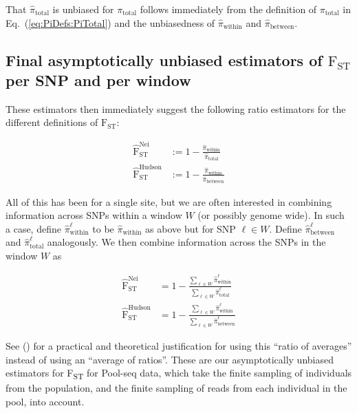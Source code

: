 \documentclass[a4paper,fontsize=9pt,DIV=14]{scrartcl}
\newcommand\eqnref[1]{Eq.~(\ref{#1})}
\newcommand{\fst}{F\textsubscript{ST}}
\newcommand\citeay[1]{\citeauthor{#1} (\citeyear{#1}) \cite{#1}}
\begin{document}
That $\widehat{\pi}_\text{total}$ is unbiased for $\pi_\text{total}$ follows immediately from the definition of $\pi_\text{total}$ in \eqnref{eq:PiDefs:PiTotal} and the unbiasedness of $\widehat{\pi}_\text{within}$ and $\widehat{\pi}_\text{between}$.


\subsection{Final asymptotically unbiased estimators of \texorpdfstring{$\text{F}_\text{ST}$}{FST} per SNP and per window}
\label{supp:sec:FST:sub:EstimatorFST}

These estimators then immediately suggest the following ratio estimators for the different definitions of $\text{F}_\text{ST}$:

\begin{align}
    \widehat{\text{F}}_\text{ST}^\text{Nei} &:= 1 - \frac{\widehat{\pi}_\text{within}}{\widehat{\pi}_\text{total}}\\
    \widehat{\text{F}}_\text{ST}^\text{Hudson} &:= 1 - \frac{\widehat{\pi}_\text{within}}{\widehat{\pi}_\text{between}}
\end{align}

All of this has been for a single site, but we are often interested in combining information across SNPs within a window $W$ (or possibly genome wide).
In such a case, define $\widehat{\pi}^\ell_\text{within}$ to be $\widehat{\pi}_\text{within}$ as above but for SNP $\ell \in W$.
Define $\widehat{\pi}^\ell_\text{between}$ and $\widehat{\pi}^\ell_\text{total}$ analogously.
We then combine information across the SNPs in the window $W$ as

\begin{align}
    \widehat{\text{F}}_\text{ST}^\text{Nei}    &= 1 - \frac{\sum_{\ell \in W} \widehat{\pi}^\ell_\text{within}} {\sum_{\ell \in W} \widehat{\pi}^\ell_\text{total}} \\
    \widehat{\text{F}}_\text{ST}^\text{Hudson} &= 1 - \frac{\sum_{\ell \in W} \widehat{\pi}^\ell_\text{within}} {\sum_{\ell \in W} \widehat{\pi}^\ell_\text{between}}
\end{align}

See \citeay{Bhatia2013} for a practical and theoretical justification for using this ``ratio of averages'' instead of using an ``average of ratios''.
These are our asymptotically unbiased estimators for \fst{} for Pool-seq data, which take the finite sampling of individuals from the population, and the finite sampling of reads from each individual in the pool, into account.
\end{document}
